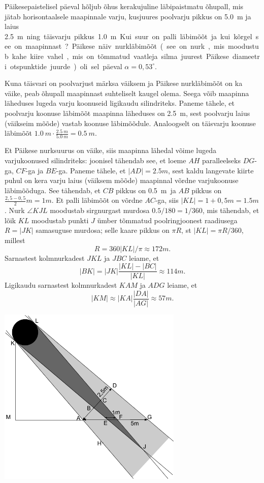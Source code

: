 
Päikesepaistelisel päeval hõljub õhus kerakujuline läbipaistmatu õhupall, mis
jätab horisontaalsele maapinnale varju, kusjuures poolvarju pikkus on \SI{5,0}{m}
ja laius \SI{2,5}m ning täisvarju pikkus \SI{1,0}{m}. Kui suur on palli
läbimõõt ja kui kõrgel see on maapinnast? Päikese näiv nurkläbimõõt (see on nurk, 
mis moodustub kahe kiire vahel, mis on tõmmatud vaatleja silma juurest 
Päikese diameetri otspunktide juurde) oli sel
päeval $\alpha =0,53^\circ$.

\hint
Kuna täisvari on poolvarjust märksa väiksem ja Päikese nurkläbimõõt on ka väike, peab õhupall maapinnast suhteliselt kaugel olema. Seega võib maapinna läheduses lugeda varju koonuseid ligikaudu silindriteks. Paneme tähele, et poolvarju koonuse läbimõõt maapinna läheduses on \SI{2,5}{m}, sest poolvarju laius (väikseim mõõde) vastab koonuse läbimõõdule. Analoogselt on täisvarju koonuse läbimõõt $\SI{1,0}{m}\cdot\frac{\SI{2,5}{m}}{\SI{5,0}{m}} = \SI{0,5}{m}$.

\solu
Et Päikese nurksuurus on väike, siis maapinna lähedal võime lugeda varjukoonused silindriteks: joonisel tähendab see, et loeme $AH$ paralleelseks $DG$-ga, $CF$-ga ja $BE$-ga.
Paneme tähele, et $|AD|=\SI{2,5}m$, sest kaldu langevate kiirte puhul on kera varju laius (väiksem mõõde) maapinnal võrdne varjukoonuse läbimõõduga.
See tähendab, et $CB$ pikkus on \SI{0,5}m ja $AB$ pikkus on $\frac{2,5-0,5}2\SI{}m=\SI{1}m$. Et palli läbimõõt on võrdne $AC$-ga, siis $|KL|=1+0,5\SI{}m=\SI{1,5}m$.
Nurk $\angle KJL$ moodustab sirgnurgast murdosa $\num{0,5}/180=1/360$, mis tähendab, et lõik $KL$ moodustab punkti $J$ ümber tõmmatud poolringjoonest raadiusega $R=|JK|$
samasuguse murdosa; selle kaare pikkus on $\pi R$, st $|KL|=\pi R /360$, millest 
\[
R=360|KL|/\pi\approx \SI{172}m.
\]
Sarnastest kolmnurkadest $JKL$ ja $JBC$ leiame, et 
\[
|BK|=|JK|\frac{|KL|-|BC|}{|KL|}\approx \SI{114}m.
\]
Ligikaudu sarnastest kolmnurkadest $KAM$ ja $ADG$ leiame, et
\[
|KM|\approx |KA|\frac{|DA|}{|AG|}\approx \SI{57}m.
\]

\begin{center}
\includegraphics[width=250pt]{2013-lahg-10-pxike-pall-vari}%
\end{center}

